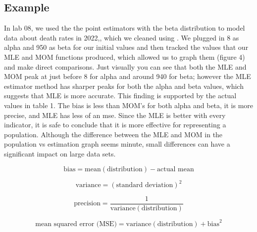 \documentclass{article}\usepackage[]{graphicx}\usepackage[]{xcolor}
\begin{document}
\begin{multicols}{2}
\subsection{Example}
  In lab 08, we used the the point estimators with the beta distribution to model data about death rates in 2022,, which we cleaned using \cite{tidyverse}. We plugged in 8 as alpha and 950 as beta for our initial values and then tracked the values that our MLE and MOM functions produced, which allowed us to graph them (figure 4) and make direct comparisons. Just visually you can see that both the MLE and MOM peak at just before 8 for alpha and around 940 for beta; however the MLE estimator method has sharper peaks for both the alpha and beta values, which suggests that MLE is more accurate. This finding is supported by the actual values in table 1. The bias is less than MOM's for both alpha and beta, it is more precise, and MLE has less of an mse. Since the MLE is better with every indicator, it is safe to conclude that it is more effective for representing a population. Although the difference between the MLE and MOM in the population vs estimation graph seems minute, small differences can have a significant impact on large data sets.
  
\[
\text{bias} = \text{mean}(\text{distribution}) - \text{actual mean}
\]

\[
\text{variance} = (\text{standard deviation})^2
\]

\[
\text{precision} = \frac{1}{\text{variance}(\text{distribution})}
\]

\[
\text{mean squared error (MSE)} = \text{variance}(\text{distribution}) + \text{bias}^2
\]

\vspace{2em}

\begin{tiny}

\end{tiny}
\end{multicols}

\newpage
\onecolumn
\end{document}

